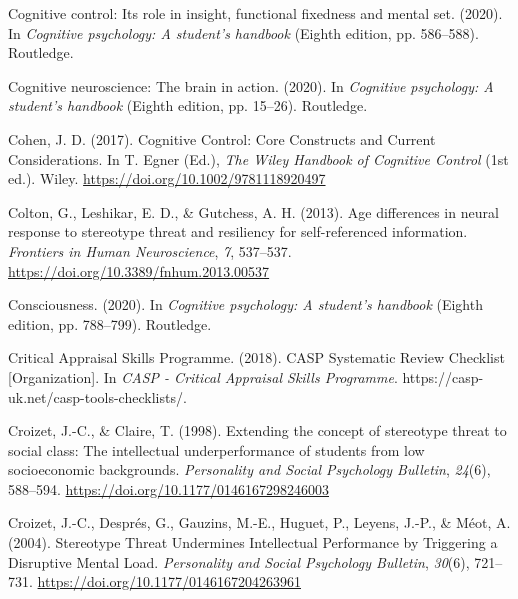 \documentclass[
  stu, a4paper,floatsintext]{apa7}
\newlength{\cslhangindent}
\newenvironment{CSLReferences}[2] %
 {\begin{list}{}{%
  \setlength{\itemindent}{0pt}
  \setlength{\leftmargin}{0pt}
  \setlength{\parsep}{0pt}
  \ifodd #1
   \setlength{\leftmargin}{\cslhangindent}
   \setlength{\itemindent}{-1\cslhangindent}
  \fi
  \setlength{\itemsep}{#2\baselineskip}}}
 {\end{list}}
\begin{document}
\begin{CSLReferences}{1}{0}
Cognitive control: Its role in insight, functional fixedness and mental set. (2020). In \emph{Cognitive psychology: A student's handbook} (Eighth edition, pp. 586--588). Routledge.

Cognitive neuroscience: The brain in action. (2020). In \emph{Cognitive psychology: A student's handbook} (Eighth edition, pp. 15--26). Routledge.

Cohen, J. D. (2017). Cognitive {Control}: {Core Constructs} and {Current Considerations}. In T. Egner (Ed.), \emph{The {Wiley Handbook} of {Cognitive Control}} (1st ed.). Wiley. \url{https://doi.org/10.1002/9781118920497}

Colton, G., Leshikar, E. D., \& Gutchess, A. H. (2013). Age differences in neural response to stereotype threat and resiliency for self-referenced information. \emph{Frontiers in Human Neuroscience}, \emph{7}, 537--537. \url{https://doi.org/10.3389/fnhum.2013.00537}

Consciousness. (2020). In \emph{Cognitive psychology: A student's handbook} (Eighth edition, pp. 788--799). Routledge.

Critical Appraisal Skills Programme. (2018). {CASP Systematic Review Checklist} {[}Organization{]}. In \emph{CASP - Critical Appraisal Skills Programme}. https://casp-uk.net/casp-tools-checklists/.

Croizet, J.-C., \& Claire, T. (1998). Extending the concept of stereotype threat to social class: {The} intellectual underperformance of students from low socioeconomic backgrounds. \emph{Personality and Social Psychology Bulletin}, \emph{24}(6), 588--594. \url{https://doi.org/10.1177/0146167298246003}

Croizet, J.-C., Després, G., Gauzins, M.-E., Huguet, P., Leyens, J.-P., \& Méot, A. (2004). Stereotype {Threat Undermines Intellectual Performance} by {Triggering} a {Disruptive Mental Load}. \emph{Personality and Social Psychology Bulletin}, \emph{30}(6), 721--731. \url{https://doi.org/10.1177/0146167204263961}


\end{CSLReferences}
\end{document}
